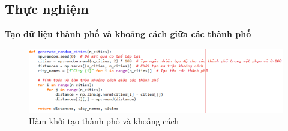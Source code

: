 \documentclass[14pt]{article}
\begin{document}
	\subsection{Thực nghiệm}
	\textbf{Tạo dữ liệu thành phố và khoảng cách giữa các thành phố}
	\begin{figure}[htbp]
		\centering
		\includegraphics[width=\textwidth]{./Image/Hàm khởi tạo thành phố và khoảng cách.png}
		\caption{Hàm khởi tạo thành phố và khoảng cách}
		\label{fig:mylabel}
	\end{figure}
	
\end{document}
